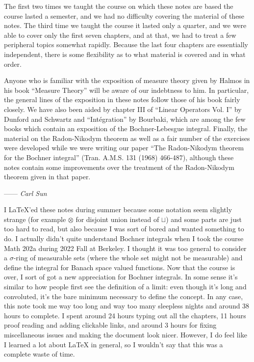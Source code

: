 The first two times we taught the course on which these notes are based the course lasted a semester, and we had no difficulty covering the material of these notes. The third time we taught the course it lasted only a quarter, and we were able to cover only the first seven chapters, and at that, we had to treat a few peripheral topics somewhat rapidly. Because the last four chapters are essentially independent, there is some flexibility as to what material is covered and in what order.

Anyone who is familiar with the exposition of measure theory given by Halmos in his book ``Measure Theory'' will be aware of our indebtness to him. In particular, the general lines of the exposition in these notes follow those of his book fairly closely. We have also been aided by chapter III of ``Linear Operators Vol. I'' by Dunford and Schwartz and ``Int\'{e}gration'' by Bourbaki, which are among the few books which contain an exposition of the Bochner-Lebesgue integral. Finally, the material on the Radon-Nikodym theorem as well as a fair number of the exercises were developed while we were writing our paper ``The Radon-Nikodym theorem for the Bochner integral'' (Tran. A.M.S. 131 (1968) 466-487), although these notes contain some improvements over the treatment of the Radon-Nikodym theorem given in that paper.



\hspace*{0pt}\hfill------ {\it Carl Sun}


I LaTeX'ed these notes during summer because some notation seem slightly strange (for example $\otimes$ for disjoint union instead of $\sqcup$) and some parts are just too hard to read, but also because I was sort of bored and wanted something to do. I actually didn't quite understand Bochner integrals when I took the course Math 202a during 2022 Fall at Berkeley. I thought it was too general to consider a $\sigma$-ring of measurable sets (where the whole set might not be measurable) and define the integral for Banach space valued functions. Now that the course is over, I sort of got a new appreciation for Bochner integrals. In some sense it's similar to how people first see the definition of a limit: even though it's long and convoluted, it's the bare minimum necessary to define the concept. In any case, this note took me way too long and way too many sleepless nights and around 38 hours to complete. I spent around 24 hours typing out all the chapters, 11 hours proof reading and adding clickable links, and around 3 hours for fixing miscellaneous issues and making the document look nicer. However, I do feel like I learned a lot about LaTeX in general, so I wouldn't say that this was a complete waste of time. 